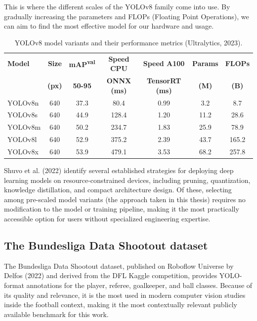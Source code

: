 This is where the different scales of the YOLOv8 family come into use. By gradually increasing the parameters and FLOPs (Floating Point Operations), we can aim to find the most effective model for our hardware and usage.

\begin{table}[H]
    \centering
    \label{tab:yolov8_variants}
    \begin{tabular}{lcccccc}
        \hline
        \textbf{Model} & \textbf{Size} & \textbf{mAP\textsuperscript{val}} & \textbf{Speed CPU} & \textbf{Speed A100} & \textbf{Params} & \textbf{FLOPs} \\
                       & \textbf{(px)} & \textbf{50-95}                    & \textbf{ONNX (ms)} & \textbf{TensorRT (ms)} & \textbf{(M)} & \textbf{(B)} \\
        \hline
        YOLOv8n & 640 & 37.3 & 80.4  & 0.99 & 3.2  & 8.7   \\
        YOLOv8s & 640 & 44.9 & 128.4 & 1.20 & 11.2 & 28.6  \\
        YOLOv8m & 640 & 50.2 & 234.7 & 1.83 & 25.9 & 78.9  \\
        YOLOv8l & 640 & 52.9 & 375.2 & 2.39 & 43.7 & 165.2 \\
        YOLOv8x & 640 & 53.9 & 479.1 & 3.53 & 68.2 & 257.8 \\
        \hline
    \end{tabular}
    \caption{YOLOv8 model variants and their performance metrics (Ultralytics, 2023)\cite{RN10}.}
\end{table}

Shuvo et al. (2022)\cite{RN17} identify several established strategies for deploying deep learning models on resource-constrained devices, including pruning, quantization, knowledge distillation, and compact architecture design. Of these, selecting among pre-scaled model variants (the approach taken in this thesis) requires no modification to the model or training pipeline, making it the most practically accessible option for users without specialized engineering expertise.


\subsection{The Bundesliga Data Shootout dataset}
The Bundesliga Data Shootout dataset, published on Roboflow Universe by Delfos (2022)\cite{RN18} and derived from the DFL Kaggle competition, provides YOLO-format annotations for the player, referee, goalkeeper, and ball classes. Because of its quality and relevance, it is the most used in modern computer vision studies inside the football context, making it the most contextually relevant publicly available benchmark for this work.


